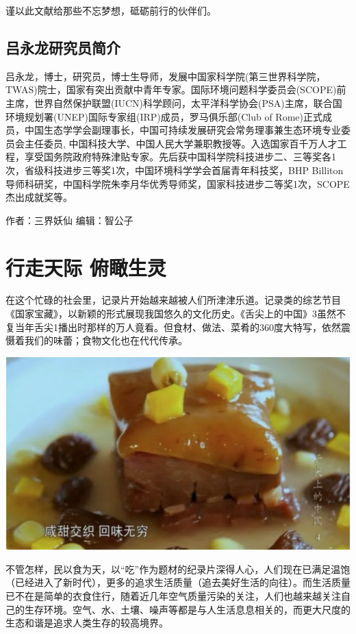 \documentclass[]{book}
\begin{document}
谨以此文献给那些不忘梦想，砥砺前行的伙伴们。

\subsection{吕永龙研究员简介}

吕永龙，博士，研究员，博士生导师，发展中国家科学院(第三世界科学院，TWAS)院士，国家有突出贡献中青年专家。国际环境问题科学委员会(SCOPE)前主席，世界自然保护联盟(IUCN)科学顾问，太平洋科学协会(PSA)主席，联合国环境规划署(UNEP)国际专家组(IRP)成员，罗马俱乐部(Club
of
Rome)正式成员，中国生态学学会副理事长，中国可持续发展研究会常务理事兼生态环境专业委员会主任委员,
中国科技大学、中国人民大学兼职教授等。入选国家百千万人才工程，享受国务院政府特殊津贴专家。先后获中国科学院科技进步二、三等奖各1次，省级科技进步三等奖1次，中国环境科学学会首届青年科技奖，BHP
Billiton导师科研奖，中国科学院朱李月华优秀导师奖，国家科技进步二等奖1次，SCOPE杰出成就奖等。

作者：三界妖仙 编辑：智公子

\section{行走天际 俯瞰生灵}\label{-}

在这个忙碌的社会里，记录片开始越来越被人们所津津乐道。记录类的综艺节目《国家宝藏》，以新颖的形式展现我国悠久的文化历史。《舌尖上的中国》3虽然不复当年舌尖1播出时那样的万人竟看。但食材、做法、菜肴的360度大特写，依然震慑着我们的味蕾；食物文化也在代代传承。

\includegraphics[width=8.33in]{images/xf1}

不管怎样，民以食为天，以``吃''作为题材的纪录片深得人心，人们现在已满足温饱（已经进入了新时代），更多的追求生活质量（追去美好生活的向往）。而生活质量已不在是简单的衣食住行，随着近几年空气质量污染的关注，人们也越来越关注自己的生存环境。空气、水、土壤、噪声等都是与人生活息息相关的，而更大尺度的生态和谐是追求人类生存的较高境界。
\end{document}
